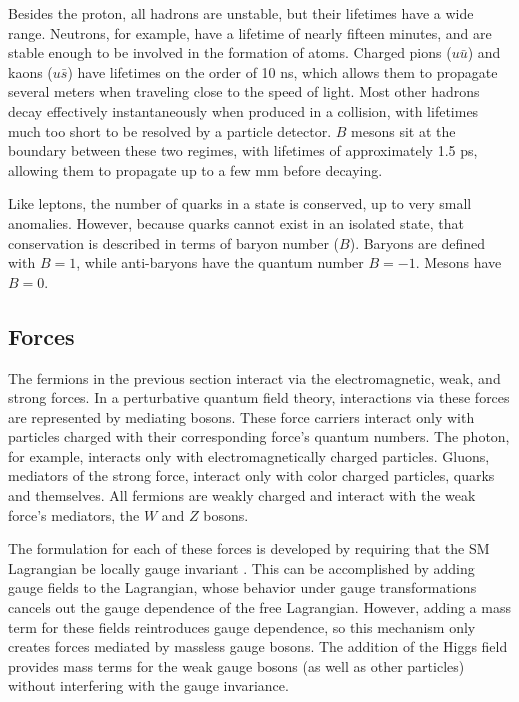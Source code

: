 Besides the proton, all hadrons are unstable, but their lifetimes have a wide range. Neutrons, for example, have a lifetime of nearly fifteen minutes, and are stable enough to be involved in the formation of atoms. Charged pions ($u\bar{u}$) and kaons ($u\bar{s}$) have lifetimes on the order of 10 ns, which allows them to propagate several meters when traveling close to the speed of light. Most other hadrons decay effectively instantaneously when produced in a collision, with lifetimes much too short to be resolved by a particle detector. $B$ mesons sit at the boundary between these two regimes, with lifetimes of approximately 1.5 ps, allowing them to propagate up to a few mm before decaying.  

Like leptons, the number of quarks in a state is conserved, up to very small anomalies. However, because quarks cannot exist in an isolated state, that conservation is described in terms of baryon number ($B$). Baryons are defined with $B=1$, while anti-baryons have the quantum number $B=-1$. Mesons have $B = 0$. 

\subsection{Forces}

The fermions in the previous section interact via the electromagnetic, weak, and strong forces. In a perturbative quantum field theory, interactions via these forces are represented by mediating bosons. These force carriers interact only with particles charged with their corresponding force's quantum numbers. The photon, for example, interacts only with electromagnetically charged particles. Gluons, mediators of the strong force, interact only with color charged particles, quarks and themselves. All fermions are weakly charged and interact with the weak force's mediators, the $W$ and $Z$ bosons. 

The formulation for each of these forces is developed by requiring that the \ac{SM} Lagrangian be locally gauge invariant \cite{Griffiths:111880}. This can be accomplished by adding gauge fields to the Lagrangian, whose behavior under gauge transformations cancels out the gauge dependence of the free Lagrangian. However, adding a mass term for these fields reintroduces gauge dependence, so this mechanism only creates forces mediated by massless gauge bosons. The addition of the Higgs field provides mass terms for the weak gauge bosons (as well as other particles) without interfering with the gauge invariance. 

